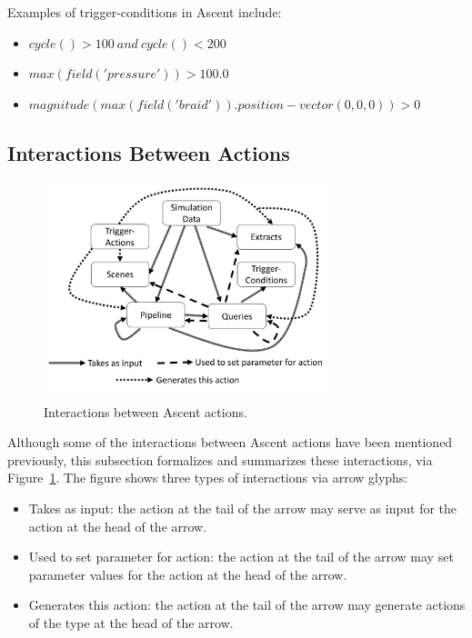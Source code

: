 Examples of trigger-conditions in Ascent include:
\begin{itemize}
\item $cycle() > 100 \ and \ cycle() < 200$
\item $max(field('pressure')) > 100.0$
\item $magnitude(max(field('braid')).position - vector(0,0,0)) > 0$
\end{itemize}

\subsection{Interactions Between Actions}

\begin{figure}
\centering
\includegraphics[width=0.75\textwidth]{images/ascent_interactions}
\caption{\label{fig:interactions} Interactions between Ascent actions.}
\end{figure}

Although some of the interactions between Ascent actions have been mentioned previously,
this subsection formalizes and summarizes these interactions, via Figure~\ref{fig:interactions}.
%
The figure shows three types of interactions via arrow glyphs:
%
\begin{itemize}
\item Takes as input: the action at the tail of the arrow may serve as input for the action at the head of the arrow.
\item Used to set parameter for action: the action at the tail of the arrow may set parameter values for the action at the head of the arrow.
\item Generates this action: the action at the tail of the arrow may generate actions of the type at the head of the arrow.
\end{itemize}

